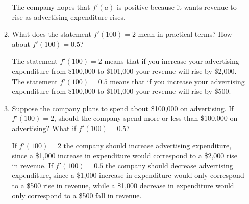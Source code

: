 \documentclass[10pt]{article}
\begin{document}
\begin{enumerate}
\begin{enumerate}
    {\color{blue} The company hopes that $f'(a)$ is positive because
      it wants revenue to rise as advertising expenditure rises.}

    \vfill
    
  \item What does the statement $f'(100) = 2$ mean in practical terms?
    How about $f'(100) = 0.5$?
    
    \vfill

    {\color{blue} The statement $f'(100) = 2$ means that if you
      increase your advertising expenditure from \$100,000 to
      \$101,000 your revenue will rise by \$2,000. The statement
      $f'(100) = 0.5$ means that if you increase your advertising
      expenditure from \$100,000 to \$101,000 your revenue will rise
      by \$500.}

    \vfill
    
  \item Suppose the company plans to spend about \$100,000 on
    advertising. If $f'(100)=2$, should the company spend more or less
    than \$100,000 on advertising? What if $f'(100) = 0.5$?
    
    \vfill

    {\color{blue} If $f'(100) = 2$ the company should increase
      advertising expenditure, since a \$1,000 increase in expenditure
      would correspond to a \$2,000 rise in revenue. If $f'(100) =
      0.5$ the company should decrease advertising expenditure, since
      a \$1,000 increase in expenditure would only correspond to a
      \$500 rise in revenue, while a \$1,000 decrease in expenditure
      would only correspond to a \$500 fall in revenue.}

    \vfill
    
  \end{enumerate}
  


\end{enumerate}
\end{document}
